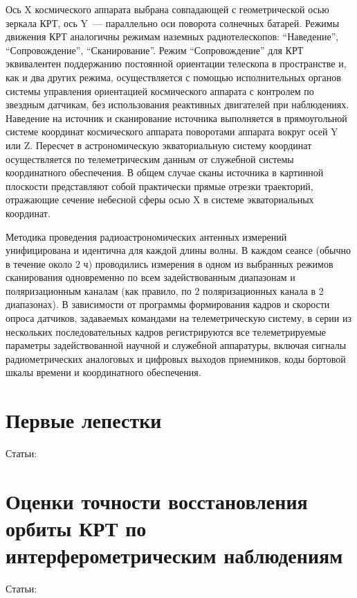 Ось X космического аппарата выбрана совпадающей с
геометрической осью зеркала КРТ, ось Y~--- параллельно оси поворота солнечных батарей. Режимы
движения КРТ аналогичны режимам наземных радиотелескопов: ``Наведение'', ``Сопровождение'',
``Сканирование''. Режим ``Сопровождение'' для КРТ эквивалентен поддержанию постоянной
ориентации телескопа в пространстве и, как и два других режима, осуществляется с помощью
исполнительных органов системы управления ориентацией космического аппарата с контролем по
звездным датчикам, без использования реактивных двигателей при наблюдениях.
Наведение на источник и сканирование источника выполняется в прямоугольной системе координат
космического аппарата поворотами аппарата вокруг осей Y или Z. Пересчет в астрономическую
экваториальную систему координат осуществляется по телеметрическим данным от служебной системы
координатного обеспечения. В общем случае сканы источника в картинной плоскости представляют собой
практически прямые отрезки траекторий, отражающие сечение небесной сферы осью X
в системе экваториальных координат.

Методика проведения радиоастрономических антенных измерений унифицирована и идентична для каждой
длины волны. В каждом сеансе (обычно в течение около 2 ч) проводились измерения в одном из выбранных
режимов сканирования одновременно по всем задействованным диапазонам и поляризационным каналам (как
правило, по 2 поляризационных канала в 2 диапазонах). В зависимости от программы формирования кадров
и скорости опроса датчиков, задаваемых командами на телеметрическую систему, в серии из нескольких
последовательных кадров регистрируются все телеметрируемые параметры задействованной научной и
служебной аппаратуры, включая сигналы радиометрических аналоговых и цифровых выходов приемников,
коды бортовой шкалы времени и координатного обеспечения.


\section{Первые лепестки}

Статьи: \cite{Kardashev_2013_rus}



\section{Оценки точности восстановления орбиты КРТ по интерферометрическим наблюдениям}

Статьи: \cite{Lobanov_2015,Zakhvatkin_2018}


